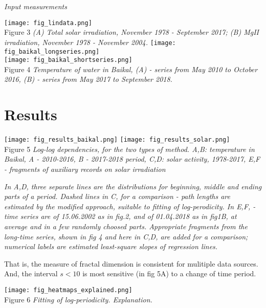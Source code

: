 \documentclass[a4paper]{article}
\begin{document}
\newpage

\textit{Input measurements}

\noindent
\texttt{[image: fig\_lindata.png]}\\
\vskip 12pt
Figure 3 \textit{(A) Total solar irradiation, November 1978 - September 2017; (B) MgII irradiation, November 1978 - November 2004.}
\vskip 12pt
\noindent
\texttt{[image: fig\_baikal\_longseries.png]}\\
\vskip 12pt
\noindent
\texttt{[image: fig\_baikal\_shortseries.png]}\\
\vskip 12pt
Figure 4 \textit{Temperature of water in Baikal, (A) - series from May 2010 to October 2016, (B) - series from May 2017 to September 2018.}

\section*{Results}

\texttt{[image: fig\_results\_baikal.png]}
\texttt{[image: fig\_results\_solar.png]}\\
Figure 5 \textit{Log-log dependencies, for the two types of method. A,B: temperature in Baikal, A - 2010-2016, B - 2017-2018 period, C,D: solar activity, 1978-2017, E,F - fragments of auxiliary records on solar irradiation}

\textit{\small{In A,D, three separate lines are the distributions for beginning, middle and ending parts of a period. Dashed lines in C, for a comparison - path lengths are estimated by the modified approach,  suitable to fitting of log-perodicity. In E,F, - time series are of 15.06.2002 as in fig.2, and of 01.04.2018 as in fig1B, at average and in a few randomly choosed parts. Appropriate fragments from the long-time series, shown in fig 4 and here in C,D, are added for a comparison; numerical labels are estimated least-square slopes of regression lines.}}

That is, the measure of fractal dimension is consistent for mulitiple data sources. And, the interval $s < 10$ is most sensitive (in fig 5A) to a change of time period.

\newpage


\vskip 12pt

\texttt{[image: fig\_heatmaps\_explained.png]}\\
Figure 6 \textit{Fitting of log-periodicity. Explanation.}
\end{document}
